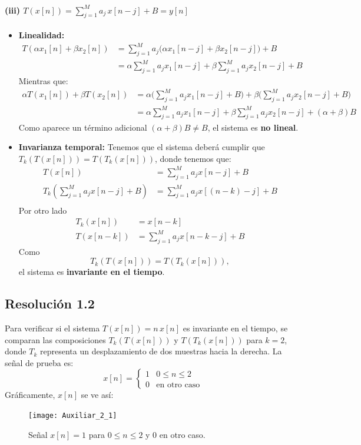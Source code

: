 \documentclass[
  11pt,
  letterpaper,
   addpoints,
   answers
  ]{exam}
\begin{document}
\begin{questions}
\begin{solution}
  \paragraph{(iii) $T(x[n]) = \sum_{j=1}^{M} a_j \, x[n-j] + B = y[n]$}
\begin{itemize}
  \item \textbf{Linealidad:}
  \begin{align}
  T(\alpha x_1[n] + \beta x_2[n]) 
    &= \sum_{j=1}^{M} a_j \big( \alpha x_1[n-j] + \beta x_2[n-j] \big) + B \\
    &= \alpha \sum_{j=1}^{M} a_j x_1[n-j] + \beta \sum_{j=1}^{M} a_j x_2[n-j] + B
  \end{align}
  Mientras que:
  \begin{align}
  \alpha T(x_1[n]) + \beta T(x_2[n]) 
    &= \alpha \Big( \sum_{j=1}^{M} a_j x_1[n-j] + B \Big) 
     + \beta \Big( \sum_{j=1}^{M} a_j x_2[n-j] + B \Big) \\
    &= \alpha \sum_{j=1}^{M} a_j x_1[n-j] + \beta \sum_{j=1}^{M} a_j x_2[n-j] + (\alpha+\beta)B
  \end{align}
  Como aparece un término adicional $(\alpha+\beta)B \neq B$, el sistema es \textbf{no lineal}.
  \item \textbf{Invarianza temporal:}
  Tenemos que el sistema deberá cumplir que $T_{k}(T(x[n])) = T(T_{k}(x[n]))$, donde tenemos que:
  \begin{align}
  T(x[n]) &= \sum_{j=1}^{M} a_j x[n-j] + B  \\
  T_k(\sum_{j=1}^{M} a_j x[n-j] + B ) &= \sum_{j=1}^{M} a_j x[(n-k)-j] + B \\
  \end{align}
  Por otro lado
  \begin{align}
  T_k(x[n]) &= x[n-k]\\
  T(x[n-k]) &= \sum_{j=1}^{M} a_j x[n-k-j] + B
  \end{align}
  Como
  \begin{equation}
  T_k(T(x[n])) = T(T_k(x[n])),
  \end{equation}
  el sistema es \textbf{invariante en el tiempo}.
\end{itemize}
\subsection*{Resolución 1.2}

Para verificar si el sistema $T(x[n]) = n\,x[n]$ es invariante en el tiempo, se comparan las composiciones $T_k(T(x[n]))$ y $T(T_k(x[n]))$ para $k = 2$, donde $T_k$ representa un desplazamiento de dos muestras hacia la derecha. La señal de prueba es:
\begin{equation}
x[n] = \begin{cases}
1 & 0 \leq n \leq 2 \\
0 & \text{en otro caso}
\end{cases}
\end{equation}
Gráficamente, $x[n]$ se ve así:
\begin{figure}[H]
  \centering
  \texttt{[image: Auxiliar\_2\_1]}
  \caption{Señal $x[n] = 1$ para $0\le n\le 2$ y 0 en otro caso.}
\end{figure}


\end{solution}
\end{questions}
\end{document}
